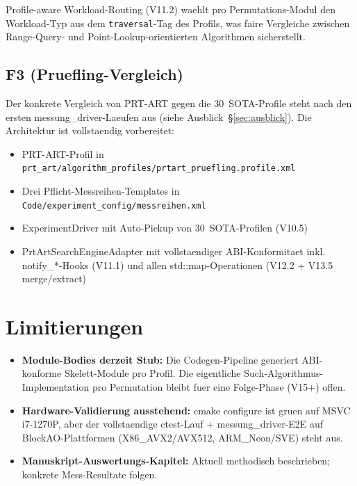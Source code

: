 Profile-aware Workload-Routing (V11.2) waehlt pro Permutations-Modul
den Workload-Typ aus dem \texttt{traversal}-Tag des Profils, was
faire Vergleiche zwischen Range-Query- und Point-Lookup-orientierten
Algorithmen sicherstellt.

\subsection*{F3 (Pruefling-Vergleich)}

Der konkrete Vergleich von PRT-ART gegen die 30~SOTA-Profile steht
nach den ersten messung\_driver-Laeufen aus (siehe Ausblick~\S\ref{sec:ausblick}).
Die Architektur ist vollstaendig vorbereitet:

\begin{itemize}
    \item PRT-ART-Profil in
          \texttt{prt\_art/algorithm\_profiles/prtart\_pruefling.profile.xml}
    \item Drei Pflicht-Messreihen-Templates in
          \texttt{Code/experiment\_config/messreihen.xml}
    \item ExperimentDriver mit Auto-Pickup von 30~SOTA-Profilen
          (V10.5)
    \item PrtArtSearchEngineAdapter mit vollstaendiger ABI-Konformitaet
          inkl. notify\_*-Hooks (V11.1) und allen std::map-Operationen
          (V12.2 + V13.5 merge/extract)
\end{itemize}

\section{Limitierungen}

\begin{itemize}
    \item \textbf{Module-Bodies derzeit Stub:} Die Codegen-Pipeline
          generiert ABI-konforme Skelett-Module pro Profil. Die
          eigentliche Such-Algorithmus-Implementation pro Permutation
          bleibt fuer eine Folge-Phase (V15+) offen.
    \item \textbf{Hardware-Validierung ausstehend:} cmake configure ist
          gruen auf MSVC i7-1270P, aber der vollstaendige ctest-Lauf +
          messung\_driver-E2E auf BlockAO-Plattformen (X86\_AVX2/AVX512,
          ARM\_Neon/SVE) steht aus.
    \item \textbf{Manuskript-Auswertungs-Kapitel:} Aktuell methodisch
          beschrieben; konkrete Mess-Resultate folgen.
\end{itemize}

